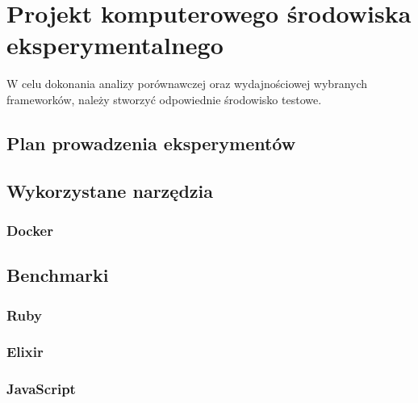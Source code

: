 \chapter{Projekt komputerowego środowiska eksperymentalnego}
W celu dokonania analizy porównawczej oraz wydajnościowej wybranych frameworków, należy stworzyć odpowiednie środowisko testowe. 

\section{Plan prowadzenia eksperymentów}

\section{Wykorzystane narzędzia}
\subsection{Docker}
\section{Benchmarki}
\subsection{Ruby}
\subsection{Elixir}
\subsection{JavaScript}

